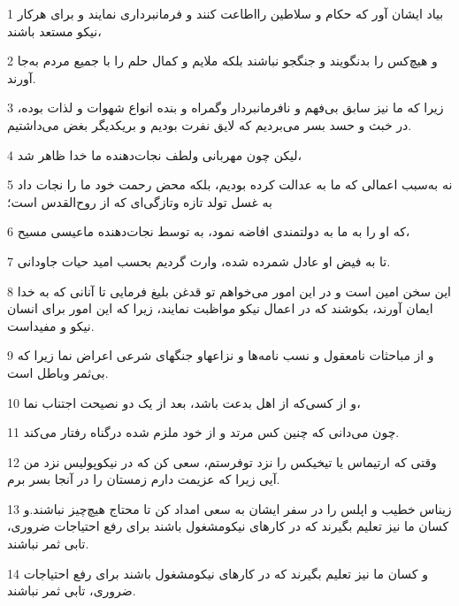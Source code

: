 \par 1 بیاد ایشان آور که حکام و سلاطین رااطاعت کنند و فرمانبرداری نمایند و برای هرکار نیکو مستعد باشند،
\par 2 و هیچ‌کس را بدنگویند و جنگجو نباشند بلکه ملایم و کمال حلم را با جمیع مردم به‌جا آورند.
\par 3 زیرا که ما نیز سابق بی‌فهم و نافرمانبردار وگمراه و بنده انواع شهوات و لذات بوده، در خبث و حسد بسر می‌بردیم که لایق نفرت بودیم و بریکدیگر بغض می‌داشتیم.
\par 4 لیکن چون مهربانی ولطف نجات‌دهنده ما خدا ظاهر شد،
\par 5 نه به‌سبب اعمالی که ما به عدالت کرده بودیم، بلکه محض رحمت خود ما را نجات داد به غسل تولد تازه وتازگی‌ای که از روح‌القدس است؛
\par 6 که او را به ما به دولتمندی افاضه نمود، به توسط نجات‌دهنده ماعیسی مسیح،
\par 7 تا به فیض او عادل شمرده شده، وارث گردیم بحسب امید حیات جاودانی.
\par 8 این سخن امین است و در این امور می‌خواهم تو قدغن بلیغ فرمایی تا آنانی که به خدا ایمان آورند، بکوشند که در اعمال نیکو مواظبت نمایند، زیرا که این امور برای انسان نیکو و مفیداست.
\par 9 و از مباحثات نامعقول و نسب نامه‌ها و نزاعهاو جنگهای شرعی اعراض نما زیرا که بی‌ثمر وباطل است.
\par 10 و از کسی‌که از اهل بدعت باشد، بعد از یک دو نصیحت اجتناب نما،
\par 11 چون می‌دانی که چنین کس مرتد و از خود ملزم شده درگناه رفتار می‌کند.
\par 12 وقتی که ارتیماس یا تیخیکس را نزد توفرستم، سعی کن که در نیکوپولیس نزد من آیی زیرا که عزیمت دارم زمستان را در آنجا بسر برم.
\par 13 زیناس خطیب و اپلس را در سفر ایشان به سعی امداد کن تا محتاج هیچ‌چیز نباشند.و کسان ما نیز تعلیم بگیرند که در کارهای نیکومشغول باشند برای رفع احتیاجات ضروری، تابی ثمر نباشند.
\par 14 و کسان ما نیز تعلیم بگیرند که در کارهای نیکومشغول باشند برای رفع احتیاجات ضروری، تابی ثمر نباشند.


